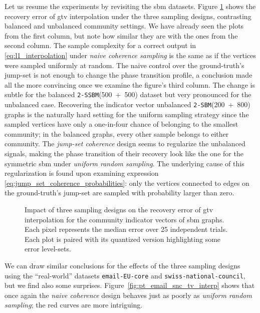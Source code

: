 Let us resume the experiments by revisiting the \acrshort{sbm} datasets. Figure \ref{fig:pt_2sbm_tv_interp} shows the recovery error of \acrshort{gtv} interpolation under the three sampling designs, contrasting balanced and unbalanced community settings. We have already seen the plots from the first column, but note how similar they are with the ones from the second column. The sample complexity for a correct output in \eqref{eq:l1_interpolation} under \emph{naive coherence sampling} is the same as if the vertices were sampled uniformly at random. The naive control over the ground-truth's jump-set is not enough to change the phase transition profile, a conclusion made all the more convincing once we examine the figure's third column. The change is subtle for the balanced \texttt{2-SSBM}(500~+~500) dataset but very pronounced for the unbalanced case. Recovering the indicator vector unbalanced \texttt{2-SBM}(200~+~800) graphs is the naturally hard setting for the uniform sampling strategy since the sampled vertices have only a one-in-four chance of belonging to the smallest community; in the balanced graphs, every other sample belongs to either community. The \emph{jump-set coherence} design seems to regularize the unbalanced signals, making the phase transition of their recovery look like the one for the symmetric \acrshort{sbm} under \emph{uniform random sampling}. The underlying cause of this regularization is found upon examining expression \eqref{eq:jump_set_coherence_probabilities}: only the vertices connected to edges on the ground-truth's jump-set are sampled with probability larger than zero.

\clearpage
\begin{figure}
    \centering
    \hfill
    \caption[Three sampling designs: \texttt{2-SSBM}(500~+~500) and \texttt{2-SBM}(200~+~800)]{Impact of three sampling designs on the recovery error of \acrshort{gtv} interpolation for the community indicator vectors of \acrshort{sbm} graphs. Each pixel represents the median error over 25 independent trials. Each plot is paired with its quantized version highlighting some error level-sets.}
    \label{fig:pt_2sbm_tv_interp}
\end{figure}
\clearpage

We can draw similar conclusions for the effects of the three sampling designs using the ``real-world'' datasets \texttt{email-EU-core} and \texttt{swiss-national-council}, but we find also some surprises. Figure~\ref{fig:pt_email_snc_tv_interp} shows that once again the \emph{naive coherence} design behaves just as poorly as \emph{uniform random sampling}; the red curves are more intriguing.


